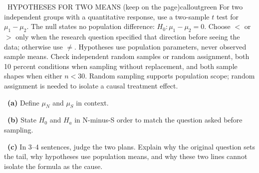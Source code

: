 \documentclass[11pt]{article}
\begin{document}
\begin{callout}{\IconBook\ HYPOTHESES FOR TWO MEANS (keep on the page)}{calloutgreen}
For two independent groups with a quantitative response, use a two-sample $t$ test for
$\mu_1-\mu_2$. The null states no population difference: $H_0:\mu_1-\mu_2=0$.
Choose $<$ or $>$ only when the research question specified that direction before seeing
the data; otherwise use $\neq$. Hypotheses use population parameters, never observed sample
means. Check independent random samples or random assignment, both 10 percent conditions
when sampling without replacement, and both sample shapes when either $n<30$. Random sampling
supports population scope; random assignment is needed to isolate a causal treatment effect.
\end{callout}

~\textbf{(a)} Define $\mu_N$ and $\mu_S$ in context.\par
{}

~\textbf{(b)} State $H_0$ and $H_a$ in N-minus-S order to match the question asked before sampling.\par
{}

~\textbf{(c)} In 3--4 sentences, judge the two plans. Explain why the original question sets the tail, why hypotheses use population means, and why these two lines cannot isolate the formula as the cause.\par
{}
\end{document}
